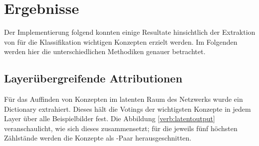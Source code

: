 \section{Ergebnisse}
Der Implementierung folgend konnten einige Resultate hinsichtlich der Extraktion von für die Klassifikation wichtigen Konzepten erzielt werden. Im Folgenden werden hier die unterschiedlichen Methodiken genauer betrachtet.

\subsection{Layerübergreifende Attributionen}
Für das Auffinden von Konzepten im latenten Raum des Netzwerks wurde ein Dictionary extrahiert. Dieses hält die Votings der wichtigsten Konzepte in jedem Layer über alle Beispielbilder fest.
Die Abbildung \ref{verb:latentoutput} veranschaulicht, wie sich dieses zusammensetzt; für die jeweils fünf höchsten Zählstände werden die Konzepte als -Paar herausgeschnitten.


